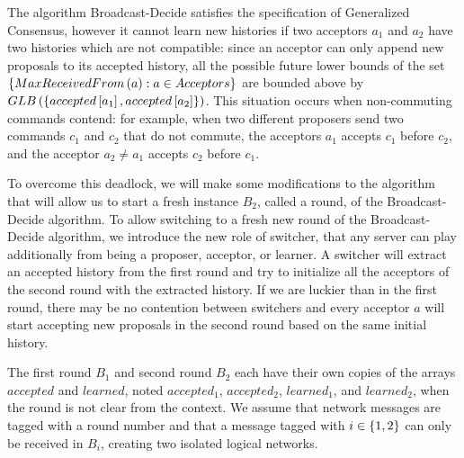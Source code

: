 The algorithm Broadcast-Decide satisfies the specification of Generalized Consensus, however it cannot learn new histories if two acceptors $a_1$ and $a_2$ have two histories which are not compatible: since an acceptor can only append new proposals to its accepted history, all the possible future lower bounds of the set $\left\{MaxReceivedFrom\left( a \right) : a \in Acceptors\right\}$ are bounded above by $GLB\left( \left\{accepted\left[ a_1 \right], accepted\left[ a_2 \right]\right\} \right)$.
This situation occurs when non-commuting commands contend: for example, when two different proposers send two commands $c_1$ and $c_2$ that do not commute, the acceptors $a_1$ accepts $c_1$ before $c_2$, and the acceptor $a_2 \neq a_1$ accepts $c_2$ before $c_1$.

To overcome this deadlock, we will make some modifications to the algorithm that will allow us to start a fresh instance $B_2$, called a round, of the Broadcast-Decide algorithm.
To allow switching to a fresh new round of the Broadcast-Decide algorithm, we introduce the new role of switcher, that any server can play additionally from being a proposer, acceptor, or learner.
A switcher will extract an accepted history from the first round and try to initialize all the acceptors of the second round with the extracted history.
If we are luckier than in the first round, there may be no contention between switchers and every acceptor $a$ will start accepting new proposals in the second round based on the same initial history.

The first round $B_1$ and second round $B_2$ each have their own copies of the arrays $accepted$ and $learned$, noted $accepted_1$, $accepted_2$, $learned_1$, and $learned_2$, when the round is not clear from the context. 
We assume that network messages are tagged with a round number and that a message tagged with $i\in\left\{1,2\right\}$ can only be received in $B_i$, creating two isolated logical networks. 

